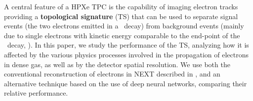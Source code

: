 \documentclass[a4paper,11pt]{article}
\begin{document}
A central feature of a HPXe TPC is the capability of imaging electron tracks providing a {\bf topological signature} (TS)  that can be used to separate signal events (the two electrons emitted in a \bbonu\ decay) from background events (mainly due to single electrons with kinetic energy comparable to the end-point of the \bbonu\ decay, \Qbb). In this paper, we study the performance of the TS, analyzing how it is affected by the various physics processes involved in the propagation of electrons in dense gas, as well as by the detector spatial resolution. We use both the conventional reconstruction of electrons in NEXT described in \cite{NEXT_topology}, and an alternative technique based on the use of deep neural networks, comparing their relative performance. 

\end{document}
